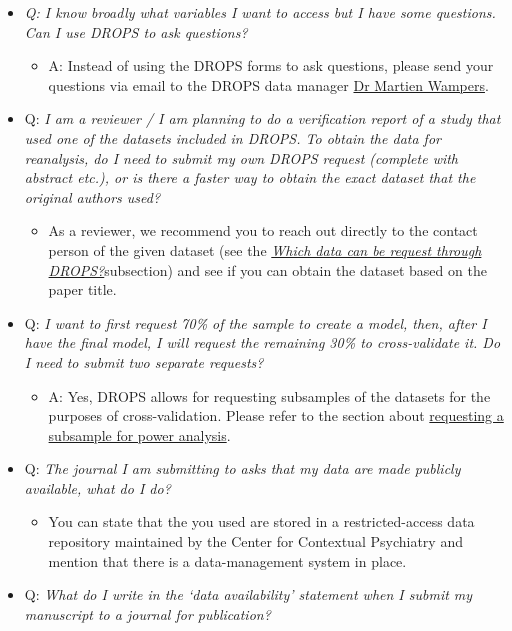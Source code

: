\documentclass[
]{article}
\providecommand{\tightlist}{%
  \setlength{\itemsep}{0pt}\setlength{\parskip}{0pt}}
\begin{document}
\begin{itemize}
\tightlist
\item
  \emph{Q: I know broadly what variables I want to access but I have
  some questions. Can I use DROPS to ask questions?}

  \begin{itemize}
  \tightlist
  \item
    A: Instead of using the DROPS forms to ask questions, please send
    your questions via email to the DROPS data manager
    \href{https://www.kuleuven.be/wieiswie/nl/person/00007576}{Dr
    Martien Wampers}.
  \end{itemize}
\item
  Q: \emph{I am a reviewer / I am planning to do a verification report
  of a study that used one of the datasets included in DROPS. To obtain
  the data for reanalysis, do I need to submit my own DROPS request
  (complete with abstract etc.), or is there a faster way to obtain the
  exact dataset that the original authors used?}

  \begin{itemize}
  \tightlist
  \item
    As a reviewer, we recommend you to reach out directly to the contact
    person of the given dataset (see the
    \protect\hyperlink{_6eanlztnrvpa}{\emph{Which data can be request
    through DROPS?}}subsection) and see if you can obtain the dataset
    based on the paper title.
  \end{itemize}
\item
  Q: \emph{I want to first request 70\% of the sample to create a model,
  then, after I have the final model, I will request the remaining 30\%
  to cross-validate it. Do I need to submit two separate requests?}

  \begin{itemize}
  \tightlist
  \item
    A: Yes, DROPS allows for requesting subsamples of the datasets for
    the purposes of cross-validation. Please refer to the section about
    \protect\hyperlink{_qlx2etgrq9hr}{requesting a subsample for power
    analysis}.
  \end{itemize}
\item
  Q: \emph{The journal I am submitting to asks that my data are made
  publicly available, what do I do?}

  \begin{itemize}
  \tightlist
  \item
    You can state that the you used are stored in a restricted-access
    data repository maintained by the Center for Contextual Psychiatry
    and mention that there is a data-management system in place.
  \end{itemize}
\item
  Q: \emph{What do I write in the `data availability' statement when I
  submit my manuscript to a journal for publication?}


\end{itemize}
\end{document}
